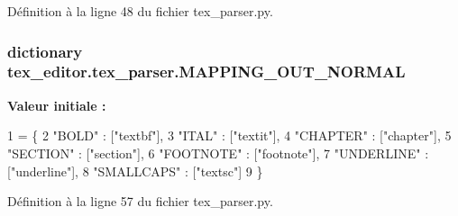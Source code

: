 Définition à la ligne 48 du fichier tex\+\_\+parser.\+py.

\hypertarget{namespacetex__editor_1_1tex__parser_aef4f62751db8b39566d55b4bf5fcc645}{}
\subsubsection[{M\+A\+P\+P\+I\+N\+G\+\_\+\+O\+U\+T\+\_\+\+N\+O\+R\+M\+A\+L}]{\setlength{\rightskip}{0pt plus 5cm}dictionary tex\+\_\+editor.\+tex\+\_\+parser.\+M\+A\+P\+P\+I\+N\+G\+\_\+\+O\+U\+T\+\_\+\+N\+O\+R\+M\+A\+L}\label{namespacetex__editor_1_1tex__parser_aef4f62751db8b39566d55b4bf5fcc645}
{\bfseries Valeur initiale \+:}
\begin{DoxyCode}
1 = \{
2 \textcolor{stringliteral}{"BOLD"} : [\textcolor{stringliteral}{"textbf"}],
3 \textcolor{stringliteral}{"ITAL"} : [\textcolor{stringliteral}{"textit"}],
4 \textcolor{stringliteral}{"CHAPTER"} : [\textcolor{stringliteral}{"chapter"}],
5 \textcolor{stringliteral}{"SECTION"} : [\textcolor{stringliteral}{"section"}],
6 \textcolor{stringliteral}{"FOOTNOTE"} : [\textcolor{stringliteral}{"footnote"}],
7 \textcolor{stringliteral}{"UNDERLINE"} : [\textcolor{stringliteral}{"underline"}],
8 \textcolor{stringliteral}{"SMALLCAPS"} : [\textcolor{stringliteral}{"textsc"}]
9 \}
\end{DoxyCode}


Définition à la ligne 57 du fichier tex\+\_\+parser.\+py.

\hypertarget{namespacetex__editor_1_1tex__parser_a9ca879b111fa4dbe32b476e800622f81}{}
